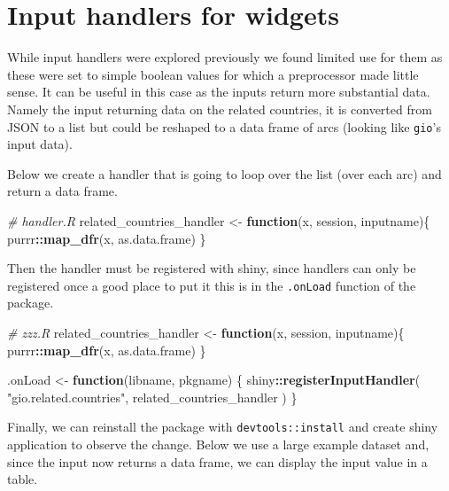 \documentclass[
]{krantz}
\makeatletter
\newenvironment{Shaded}{\begin{snugshade}}{\end{snugshade}}
\newcommand{\CommentTok}[1]{\textcolor[rgb]{0.37,0.37,0.37}{\textit{#1}}}
\newcommand{\ControlFlowTok}[1]{\textcolor[rgb]{0.27,0.27,0.27}{\textbf{#1}}}
\newcommand{\KeywordTok}[1]{\textcolor[rgb]{0.27,0.27,0.27}{\textbf{#1}}}
\newcommand{\NormalTok}[1]{#1}
\newcommand{\OperatorTok}[1]{\textcolor[rgb]{0.43,0.43,0.43}{\textbf{#1}}}
\newcommand{\StringTok}[1]{\textcolor[rgb]{0.5,0.5,0.5}{#1}}
\newenvironment{kframe}{%
\medskip{}
\setlength{\fboxsep}{.8em}
 \def\at@end@of@kframe{}%
 \ifinner\ifhmode%
  \def\at@end@of@kframe{\end{minipage}}%
  \begin{minipage}{\columnwidth}%
 \fi\fi%
 \def\FrameCommand##1{\hskip\@totalleftmargin \hskip-\fboxsep
 \colorbox{shadecolor}{##1}\hskip-\fboxsep
     \hskip-\linewidth \hskip-\@totalleftmargin \hskip\columnwidth}%
 \MakeFramed {\advance\hsize-\width
   \@totalleftmargin\z@ \linewidth\hsize
   \@setminipage}}%
 {\par\unskip\endMakeFramed%
 \at@end@of@kframe}
\renewenvironment{Shaded}{\begin{kframe}}{\end{kframe}}
\makeatother
\begin{document}
\hypertarget{input-handlers-for-widgets}{%
\section{Input handlers for widgets}\label{input-handlers-for-widgets}}

While input handlers were explored previously we found limited use for them as these were set to simple boolean values for which a preprocessor made little sense. It can be useful in this case as the inputs return more substantial data. Namely the input returning data on the related countries, it is converted from JSON to a list but could be reshaped to a data frame of arcs (looking like \texttt{gio}'s input data).

Below we create a handler that is going to loop over the list (over each arc) and return a data frame.

\begin{Shaded}
\begin{Highlighting}[]
\CommentTok{\# handler.R}
\NormalTok{related\_countries\_handler <{-}}\StringTok{ }\ControlFlowTok{function}\NormalTok{(x, session, inputname)\{}
\NormalTok{  purrr}\OperatorTok{::}\KeywordTok{map\_dfr}\NormalTok{(x, as.data.frame)}
\NormalTok{\}}
\end{Highlighting}
\end{Shaded}

Then the handler must be registered with shiny, since handlers can only be registered once a good place to put it this is in the \texttt{.onLoad} function of the package.

\begin{Shaded}
\begin{Highlighting}[]
\CommentTok{\# zzz.R}
\NormalTok{related\_countries\_handler <{-}}\StringTok{ }\ControlFlowTok{function}\NormalTok{(x, session, inputname)\{}
\NormalTok{  purrr}\OperatorTok{::}\KeywordTok{map\_dfr}\NormalTok{(x, as.data.frame)}
\NormalTok{\}}

\NormalTok{.onLoad <{-}}\StringTok{ }\ControlFlowTok{function}\NormalTok{(libname, pkgname) \{}
\NormalTok{  shiny}\OperatorTok{::}\KeywordTok{registerInputHandler}\NormalTok{(}
    \StringTok{"gio.related.countries"}\NormalTok{, }
\NormalTok{    related\_countries\_handler}
\NormalTok{  )}
\NormalTok{\}}
\end{Highlighting}
\end{Shaded}

Finally, we can reinstall the package with \texttt{devtools::install} and create shiny application to observe the change. Below we use a large example dataset and, since the input now returns a data frame, we can display the input value in a table.
\end{document}
